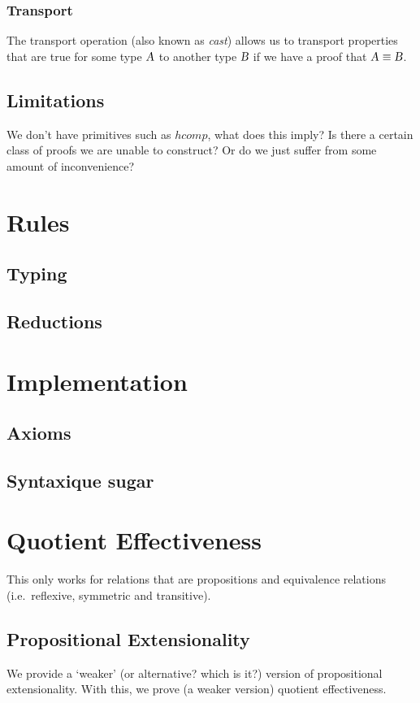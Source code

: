 \documentclass[11pt]{article}
\newcommand \id[1] {\textsl{#1}}
\begin{document}
\subsubsection{Transport}
The transport operation (also known as {\id{cast}}) allows us to transport properties that are true for some type $\id{A}$ to another type $\id{B}$ if we have a proof that $\eqtype{\id{A}}{\id{B}}$.

\subsection{Limitations}
We don't have primitives such as $hcomp$, what does this imply? Is there a certain class of proofs we are unable to construct? Or do we just suffer from some amount of inconvenience?


\section{Rules}
\subsection{Typing}
\subsection{Reductions}

\section{Implementation}
\subsection{Axioms}
\subsection{Syntaxique sugar}

\section{Quotient Effectiveness}
This only works for relations that are propositions and equivalence relations (i.e.\ reflexive, symmetric and transitive).
\subsection{Propositional Extensionality}
We provide a `weaker' (or alternative? which is it?) version of propositional extensionality. With this, we prove (a weaker version) quotient effectiveness.
\end{document}
